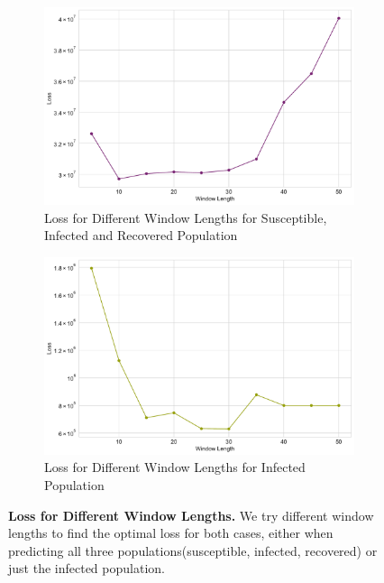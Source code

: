 \documentclass[tikz,fleqn,12pt]{wlscirep}
\begin{document}
\begin{figure}[htbp!]
  \begin{subfigure}[t]{0.48\textwidth}
    \centering
    \includegraphics[width=\linewidth]{images/window_length_loss_SIR_IND.pdf}
    \caption{Loss for Different Window Lengths for Susceptible, Infected and Recovered Population}
    \label{fig:window_length_loss_SIR_IND}
  \end{subfigure}
  \hfill
  \begin{subfigure}[t]{0.48\textwidth}
    \centering
    \includegraphics[width=\linewidth]{images/window_length_loss_I_IND.pdf}
    \caption{Loss for Different Window Lengths for Infected Population}
    \label{fig:window_length_loss_I_IND}
  \end{subfigure}
  \caption{\textbf{Loss for Different Window Lengths.} We try different window lengths to find the optimal loss for both cases, either when predicting all three populations(susceptible, infected, recovered) or just the infected population.}
\end{figure}
\end{document}
